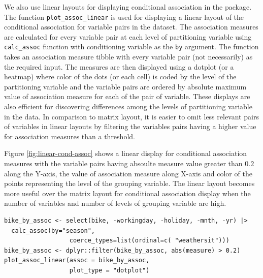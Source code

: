 We also use linear layouts for displaying conditional association in the package. The function \texttt{plot\_assoc\_linear} is used for displaying a linear layout of the conditional association for variable pairs in the dataset. The association measures are calculated for every variable pair at each level of partitioning variable using \texttt{calc\_assoc} function with conditioning variable as the \texttt{by} argument. The function takes an association measure tibble with every variable pair (not necessarily) as the required input. The measures are then displayed using a dotplot (or a heatmap) where color of the dots (or each cell) is coded by the level of the partitioning variable and the variable pairs are ordered by absolute maximum value of association measure for each of the pair of variable. These displays are also efficient for discovering differences among the levels of partitioning variable in the data. In comparison to matrix layout, it is easier to omit less relevant pairs of variables in linear layouts by filtering the variables pairs having a higher value for association measures than a threshold.

Figure \ref{fig:linear-cond-assoc} shows a linear display for conditional association measures with the variable pairs having absoulte measure value greater than \(0.2\) along the Y-axis, the value of association measure along X-axis and color of the points representing the level of the grouping variable. The linear layout becomes more useful over the matrix layout for conditional association display when the number of variables and number of levels of grouping variable are high.

\begin{verbatim}
bike_by_assoc <- select(bike, -workingday, -holiday, -mnth, -yr) |>
  calc_assoc(by="season", 
                  coerce_types=list(ordinal=c( "weathersit")))
bike_by_assoc <- dplyr::filter(bike_by_assoc, abs(measure) > 0.2)
plot_assoc_linear(assoc = bike_by_assoc,
                  plot_type = "dotplot")
\end{verbatim}

